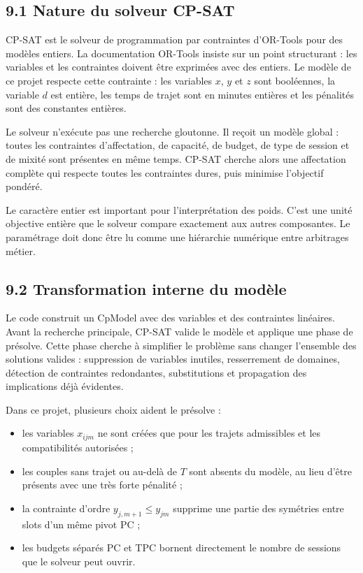 \documentclass[11pt,a4paper]{article}
\begin{document}
\subsection{9.1 Nature du solveur CP-SAT}

CP-SAT est le solveur de programmation par contraintes d'OR-Tools pour des modèles entiers. La documentation OR-Tools insiste sur un point structurant : les variables et les contraintes doivent être exprimées avec des entiers. Le modèle de ce projet respecte cette contrainte : les variables $x$, $y$ et $z$ sont booléennes, la variable $d$ est entière, les temps de trajet sont en minutes entières et les pénalités sont des constantes entières.

Le solveur n'exécute pas une recherche gloutonne. Il reçoit un modèle global : toutes les contraintes d'affectation, de capacité, de budget, de type de session et de mixité sont présentes en même temps. CP-SAT cherche alors une affectation complète qui respecte toutes les contraintes dures, puis minimise l'objectif pondéré.

Le caractère entier est important pour l'interprétation des poids. C'est une unité objective entière que le solveur compare exactement aux autres composantes. Le paramétrage doit donc être lu comme une hiérarchie numérique entre arbitrages métier.

\subsection{9.2 Transformation interne du modèle}

Le code construit un CpModel avec des variables et des contraintes linéaires. Avant la recherche principale, CP-SAT valide le modèle et applique une phase de présolve. Cette phase cherche à simplifier le problème sans changer l'ensemble des solutions valides : suppression de variables inutiles, resserrement de domaines, détection de contraintes redondantes, substitutions et propagation des implications déjà évidentes.

Dans ce projet, plusieurs choix aident le présolve :

\begin{itemize}
\item les variables $x_{ijm}$ ne sont créées que pour les trajets admissibles et les
compatibilités autorisées ;

\item les couples sans trajet ou au-delà de $T$ sont absents du modèle, au lieu d'être
présents avec une très forte pénalité ;

\item la contrainte d'ordre $y_{j,m+1} \leq y_{jm}$ supprime une partie des symétries
entre slots d'un même pivot PC ;

\item les budgets séparés PC et TPC bornent directement le nombre de sessions que le
solveur peut ouvrir.

\end{itemize}
\end{document}
